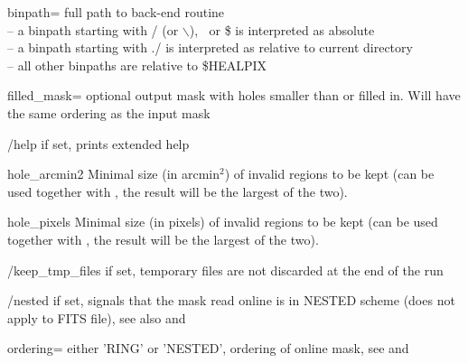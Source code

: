 \begin{keywords}
  \begin{kwlist}{} %
 \item[binpath=]  full path to back-end routine \\
              -- a binpath starting with / (or $\backslash$), $~$ or \$ is interpreted as absolute\\
              -- a binpath starting with ./ is interpreted as relative to current directory\\
              -- all other binpaths are relative to \$HEALPIX

 \item[filled\_mask=]  optional output
mask with holes smaller than 
 or 
 filled in.
     Will have the same ordering as the input mask

 \item[/help]       if set, prints extended help

 \item[hole\_arcmin2]    Minimal size
(in arcmin$^2$) of invalid regions to be kept 
    (can be used together with , 
     the result will be the largest of the two). 

 \item[hole\_pixels]    Minimal size (in pixels) of invalid regions to be kept 
    (can be used together with , 
     the result will be the largest of the two). 

\item[/keep\_tmp\_files]  if set,
temporary files are not discarded at the end of the run

\item[/nested]  if set, signals that the mask read online is in
   NESTED scheme (does not apply to FITS file), see also
 and 

\item[ordering=]  either 'RING' or 'NESTED', ordering of online mask,
 see 
 and 


\end{kwlist}
\end{keywords}
